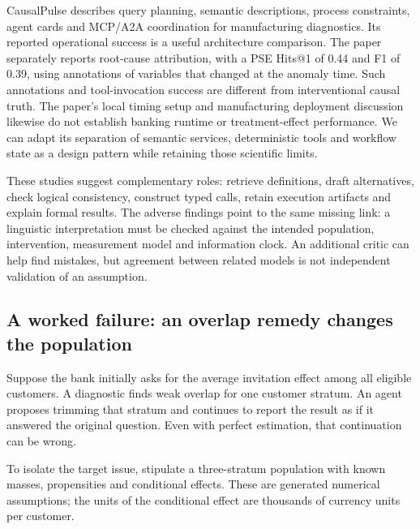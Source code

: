 CausalPulse describes query planning, semantic descriptions, process
constraints, agent cards and MCP/A2A coordination for manufacturing
diagnostics. Its reported operational success is a useful architecture
comparison. The paper separately reports root-cause attribution, with a
PSE Hits@1 of 0.44 and F1 of 0.39, using annotations of variables that
changed at the anomaly time. Such annotations and tool-invocation
success are different from interventional causal truth. The paper's
local timing setup and manufacturing deployment discussion likewise do
not establish banking runtime or treatment-effect performance. We can
adapt its separation of semantic services, deterministic tools and
workflow state as a design pattern while retaining those scientific
limits. \citep{exec13_pulse}

These studies suggest complementary roles: retrieve definitions, draft
alternatives, check logical consistency, construct typed calls, retain
execution artifacts and explain formal results. The adverse findings
point to the same missing link: a linguistic interpretation must be
checked against the intended population, intervention, measurement model
and information clock. An additional critic can help find mistakes, but
agreement between related models is not independent validation of an
assumption.

\hypertarget{a-worked-failure-an-overlap-remedy-changes-the-population}{%
\subsection{A worked failure: an overlap remedy changes the
population}\label{a-worked-failure-an-overlap-remedy-changes-the-population}}

Suppose the bank initially asks for the average invitation effect among
all eligible customers. A diagnostic finds weak overlap for one customer
stratum. An agent proposes trimming that stratum and continues to report
the result as if it answered the original question. Even with perfect
estimation, that continuation can be wrong.

To isolate the target issue, stipulate a three-stratum population with
known masses, propensities and conditional effects. These are generated
numerical assumptions; the units of the conditional effect are thousands
of currency units per customer.

